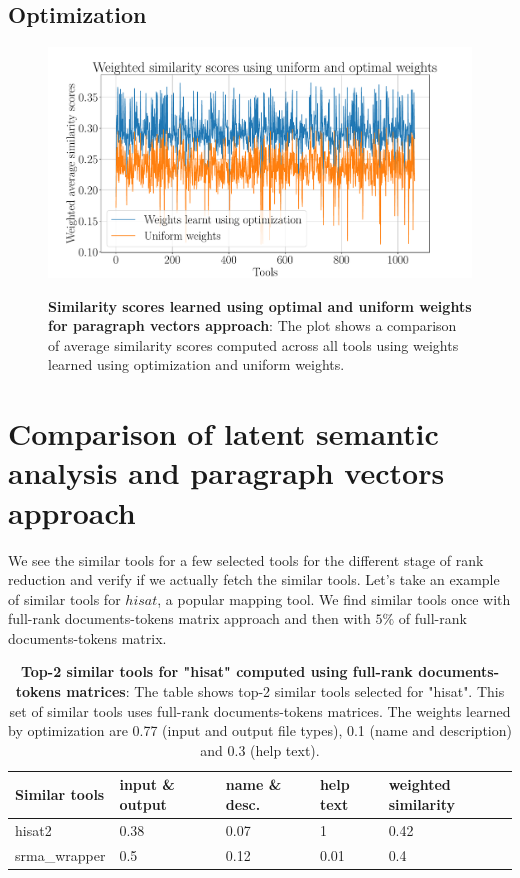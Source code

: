 \subsection{Optimization}
\begin{figure}[h]
\begin{centering}
    {\includegraphics[scale=0.45]{figures/weighted_optimal_uniform_scores.pdf}}
    \caption[Optimal uniform similarity scores]{\textbf{Similarity scores learned using optimal and uniform weights for paragraph vectors approach}: The plot shows a comparison of average similarity scores computed across all tools using weights learned using optimization and uniform weights. }
\end{centering}
\end{figure}

\section{Comparison of latent semantic analysis and paragraph vectors approach}
We see the similar tools for a few selected tools for the different stage of rank reduction and verify if we actually fetch the similar tools. Let's take an example of similar tools for $hisat$, a popular mapping tool. We find similar tools once with full-rank documents-tokens matrix approach and then with $5\%$ of full-rank documents-tokens matrix.

\begin{table}[ht]
\begin{center}
    \begin{tabular}{|l|l|l|l|l|}
        \hline
        Similar tools & input \& output & name \& desc. & help text & weighted similarity \\ \hline
        hisat2   & 0.38 & 0.07 & 1 & 0.42  \\ \hline
        srma\_wrapper & 0.5 & 0.12 & 0.01 & 0.4 \\ \hline
    \end{tabular}
    \end{center}
    \caption[Similar tools for hisat 100\%]{\textbf{Top-2 similar tools for "hisat" computed using full-rank documents-tokens matrices}: The table shows top-2 similar tools selected for "hisat". This set of similar tools uses full-rank documents-tokens matrices. The weights learned by optimization are 0.77 (input and output file types), 0.1 (name and description) and 0.3 (help text). }
    \label{tab:accuracy}
\end{table}

